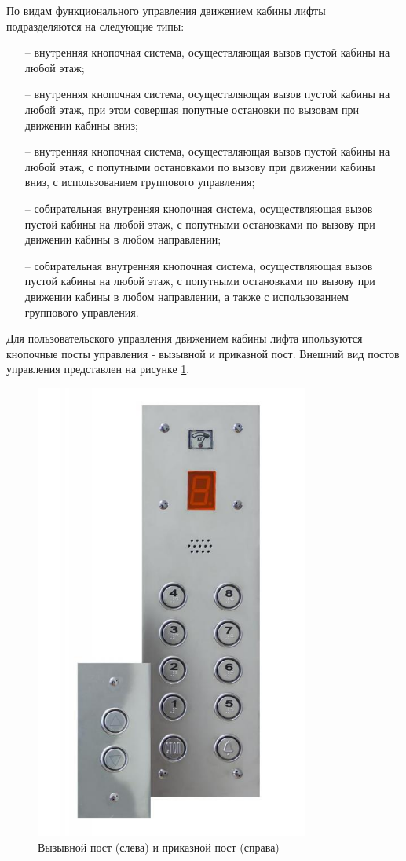 	По видам функционального управления движением кабины лифты подразделяются на следующие типы:
		\begin{itemize}
			\item[--] внутренняя кнопочная система, осуществляющая вызов пустой кабины на любой этаж;
			\item[--] внутренняя кнопочная система, осуществляющая вызов пустой кабины на любой этаж,
				при этом совершая попутные остановки по вызовам при движении кабины вниз;
			\item[--] внутренняя кнопочная система, осуществляющая вызов пустой кабины на любой этаж,
				с попутными остановками по вызову при движении кабины вниз, с использованием группового управления;
			\item[--] собирательная внутренняя кнопочная система, осуществляющая вызов пустой кабины на любой этаж,
				с попутными остановками по вызову при движении кабины в любом направлении;
			\item[--] собирательная внутренняя кнопочная система, осуществляющая вызов пустой кабины на любой этаж,
				с попутными остановками по вызову при движении кабины  в любом направлении,
				а также с использованием группового управления.
		\end{itemize}
        
    Для пользовательского управления движением кабины лифта ипользуются кнопочные посты управления - вызывной и приказной пост.             Внешний вид постов управления представлен на рисунке \ref{dk2}.
    
     \begin{figure}[h]
				\centering
				\includegraphics[width=90mm]{src/pictures/posti_upravlenia.jpg}
				\caption{Вызывной пост (слева) и приказной пост (справа)}\label{dk2}
    \end{figure}

